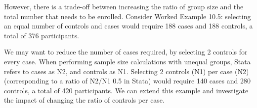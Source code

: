 \documentclass[
]{memoir}
\begin{document}
However, there is a trade-off between increasing the ratio of group size and the total number that needs to be enrolled. Consider Worked Example 10.5: selecting an equal number of controls and cases would require 188 cases and 188 controls, a total of 376 participants.

We may want to reduce the number of cases required, by selecting 2 controls for every case. When performing sample size calculations with unequal groups, Stata refers to cases as N2, and controls as N1. Selecting 2 controls (N1) per case (N2) (corresponding to a ratio of N2/N1 0.5 in Stata) would require 140 cases and 280 controls, a total of 420 participants. We can extend this example and investigate the impact of changing the ratio of controls per case.

 
  \providecommand{\huxb}[2]{\arrayrulecolor[RGB]{#1}\global\arrayrulewidth=#2pt}
  \providecommand{\huxvb}[2]{\color[RGB]{#1}\vrule width #2pt}
  \providecommand{\huxtpad}[1]{\rule{0pt}{#1}}
  \providecommand{\huxbpad}[1]{\rule[-#1]{0pt}{#1}}
\end{document}
